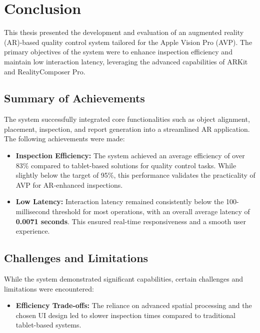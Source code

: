 \section{Conclusion}

This thesis presented the development and evaluation of an augmented reality (AR)-based quality control system tailored for the Apple Vision Pro (AVP). The primary objectives of the system were to enhance inspection efficiency and maintain low interaction latency, leveraging the advanced capabilities of ARKit and RealityComposer Pro.

\subsection{Summary of Achievements}
The system successfully integrated core functionalities such as object alignment, placement, inspection, and report generation into a streamlined AR application. The following achievements were made:
\begin{itemize}
    \item \textbf{Inspection Efficiency:} The system achieved an average efficiency of over 83\% compared to tablet-based solutions for quality control tasks. While slightly below the target of 95\%, this performance validates the practicality of AVP for AR-enhanced inspections.
    \item \textbf{Low Latency:} Interaction latency remained consistently below the 100-millisecond threshold for most operations, with an overall average latency of \textbf{0.0071 seconds}. This ensured real-time responsiveness and a smooth user experience.
\end{itemize}

\subsection{Challenges and Limitations}
While the system demonstrated significant capabilities, certain challenges and limitations were encountered:
\begin{itemize}
    \item \textbf{Efficiency Trade-offs:} The reliance on advanced spatial processing and the chosen UI design led to slower inspection times compared to traditional tablet-based systems.
\end{itemize}

